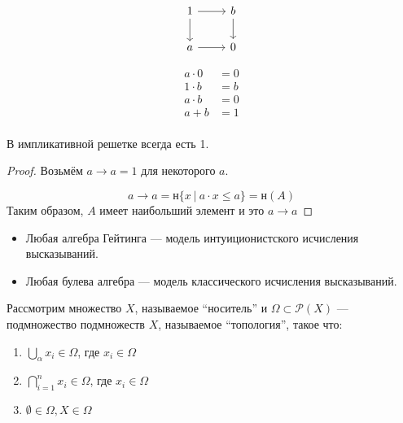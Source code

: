 \begin{example}
    $$\begin{tikzcd}[ampersand replacement=\&]
            1 \arrow{r} \arrow[swap]{d}{} \& b \arrow{d}{} \\
            a \arrow{r} \& 0
        \end{tikzcd}$$

    \begin{align*}
        a\cdot 0 & = 0 \\
        1\cdot b & = b \\
        a\cdot b & = 0 \\
        a + b    & = 1 \\
    \end{align*}
\end{example}

\begin{lemma}
    В импликативной решетке всегда есть 1.
\end{lemma}
\begin{proof}
    Возьмём \(a \to a = 1\) для некоторого \(a\).

    \[a \to a = \text{н} \{x\ |\ a\cdot x \leq a\} = \text{н}(A)\]
    Таким образом, \(A\) имеет наибольший элемент и это \(a \to a\)
\end{proof}

\begin{theorem}\itemfix
    \begin{itemize}
        \item Любая алгебра Гейтинга --- модель интуиционистского исчисления высказываний.
        \item Любая булева алгебра --- модель классического исчисления высказываний.
    \end{itemize}
\end{theorem}

\begin{definition}[топология]
    Рассмотрим множество \(X\), называемое ``носитель'' и \(\Omega \subset \mathcal{P}(X)\) --- подмножество подмножеств \(X\), называемое ``топология'', такое что:
    \begin{enumerate}
        \item \(\bigcup_\alpha x_i \in \Omega\), где \(x_i\in\Omega\)
        \item \(\bigcap_{i = 1}^{n} x_i \in \Omega\), где \(x_i\in\Omega\)
        \item \(\emptyset\in\Omega, X\in \Omega\)
    \end{enumerate}
\end{definition}

